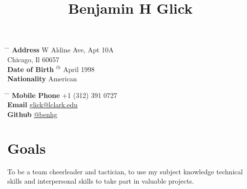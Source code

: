 \documentclass[10pt]{article} %
\begin{document}

\title{Benjamin H Glick} %


\parbox{0.5\textwidth}{ %
\begin{tabbing} %
\hspace{3cm} \= \hspace{4cm} \= \kill %
{\bf Address}  W Aldine Ave, Apt 10A\\ %
\>Chicago, Il 60657  \\ %
{\bf Date of Birth} $^{th}$ April 1998 \\ %
{\bf Nationality} \> American %
\end{tabbing}}
\hfill %
\parbox{0.5\textwidth}{ %
\begin{tabbing} %
\hspace{3cm} \= \hspace{4cm} \= \kill %
{\bf Mobile Phone} \> +1 (312) 391 0727 \\ %
{\bf Email} \> \href{mailto:glick@lclark.edu}{glick@lclark.edu} \\ %
{\bf Github} \> \href{https://github.com/benhg}{@benhg} \\ %
\end{tabbing}}


\section{Goals}

{To be a team cheerleader and tactician, to use my subject knowledge technical skills and interpersonal skills to take part in valuable projects.}
\end{document}
